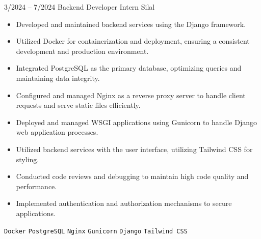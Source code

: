 \documentclass[9pt]{developercv} %
\begin{document}
\begin{entrylist}
    \entry
        {3/2024 -- 7/2024}
        {Backend Developer Intern}
        {Silal}
        {\vspace{-10pt}
        \begin{itemize}[noitemsep,topsep=0pt,parsep=0pt,partopsep=0pt, leftmargin=-1pt]
            \item Developed and maintained backend services using the Django framework.
            \item Utilized Docker for containerization and deployment, ensuring a consistent development and production environment.
            \item Integrated PostgreSQL as the primary database, optimizing queries and maintaining data integrity.
            \item Configured and managed Nginx as a reverse proxy server to handle client requests and serve static files efficiently.
            \item Deployed and managed WSGI applications using Gunicorn to handle Django web application processes.
            \item Utilized backend services with the user interface, utilizing Tailwind CSS for styling.
            \item Conducted code reviews and debugging to maintain high code quality and performance.
            \item Implemented authentication and authorization mechanisms to secure applications.
        \end{itemize} 
        \texttt{Docker} \slashsep \texttt{PostgreSQL} \slashsep \texttt{Nginx} \slashsep \texttt{Gunicorn} \slashsep \texttt{Django} \slashsep \texttt{Tailwind CSS}}
\end{entrylist}
\end{document}
